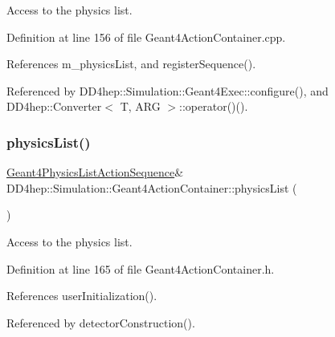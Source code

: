 Access to the physics list. 



Definition at line 156 of file Geant4\+Action\+Container.\+cpp.



References m\+\_\+physics\+List, and register\+Sequence().



Referenced by D\+D4hep\+::\+Simulation\+::\+Geant4\+Exec\+::configure(), and D\+D4hep\+::\+Converter$<$ T, A\+R\+G $>$\+::operator()().

\hypertarget{class_d_d4hep_1_1_simulation_1_1_geant4_action_container_aaeb1188d7bf8338290d1d7080c5c2e18}{}\label{class_d_d4hep_1_1_simulation_1_1_geant4_action_container_aaeb1188d7bf8338290d1d7080c5c2e18} 
\subsubsection{\texorpdfstring{physics\+List()}{physicsList()}\hspace{0.1cm}{\footnotesize\ttfamily [2/2]}}
{\footnotesize\ttfamily \hyperlink{class_d_d4hep_1_1_simulation_1_1_geant4_physics_list_action_sequence}{Geant4\+Physics\+List\+Action\+Sequence}\& D\+D4hep\+::\+Simulation\+::\+Geant4\+Action\+Container\+::physics\+List (\begin{DoxyParamCaption}{ }\end{DoxyParamCaption})\hspace{0.3cm}{\ttfamily [inline]}}



Access to the physics list. 



Definition at line 165 of file Geant4\+Action\+Container.\+h.



References user\+Initialization().



Referenced by detector\+Construction().

\hypertarget{class_d_d4hep_1_1_simulation_1_1_geant4_action_container_a95c55e436d351d75cf1aaac43aa6cc1b}{}\label{class_d_d4hep_1_1_simulation_1_1_geant4_action_container_a95c55e436d351d75cf1aaac43aa6cc1b} 
